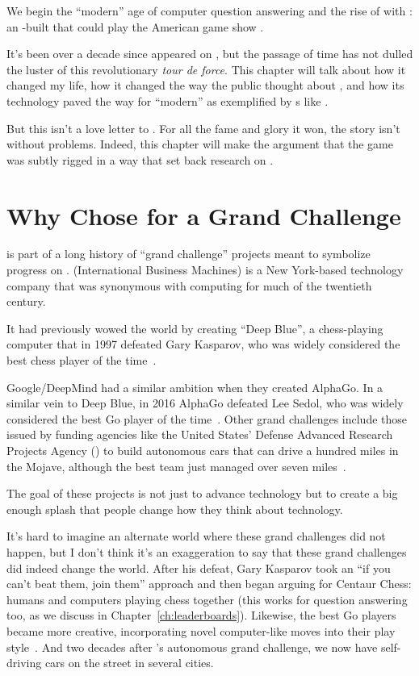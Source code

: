 
We begin the ``modern'' age of computer question answering and the rise of
 with \watson{}: an -built  that could play the
American game show \jeopardyf{}.

It's been over a decade since \watson{} appeared on , but the
passage of time has not dulled the luster of this revolutionary
\textit{tour de force}.
%
This chapter will talk about how it changed my life, how it
changed the way the public thought about , and how its technology
paved the way for ``modern''  as exemplified by \mm{}s like .

But this isn't a love letter to \watson{}.
%
For all the fame and glory it won, the \watson{} story isn't without
problems.
%
Indeed, this chapter will make the
argument that the game was subtly rigged in a way that set back research on
.

\section{Why  Chose \jeopardy{} for a Grand Challenge}
\label{sec:grand-challenge}

\watson{} is part of a long history of ``grand challenge'' projects meant to
symbolize progress on .
%
 (International Business Machines) is a New York-based technology
company that was synonymous with computing for much of the twentieth century.



It had previously wowed the world by creating ``Deep Blue'', a chess-playing
computer that in 1997 defeated Gary Kasparov, who was widely considered the
best chess player of the time~\citep{hsu-02}.

Google/DeepMind had a similar ambition when they created AlphaGo.
%
In a similar vein to Deep Blue, in 2016 AlphaGo defeated Lee Sedol,
who was widely considered the best Go player of the time~\citep{koch-16}.
%
Other  grand challenges include those issued by funding agencies like
the United States' Defense Advanced Research Projects Agency
() to build autonomous cars that can drive a hundred miles
in the Mojave, although the best team just managed over seven miles~\citep{patterson-05}.
%

The goal of these projects is not just to advance technology but to create a
big enough splash that people change how they think about technology.

It's hard to imagine an alternate world where these grand challenges did not
happen, but I don't think it's an exaggeration to say that these grand challenges
did indeed change the world.  
%
After his defeat, Gary Kasparov took an ``if you can't beat them, join them''
approach and then began arguing for Centaur Chess: humans and computers
playing chess together (this works for question answering too, as we discuss
in Chapter~\ref{ch:leaderboards}).
%
Likewise, the best Go players became more creative, incorporating
novel computer-like moves into their play style~\citep{shin-25}.
%
And two decades after 's autonomous grand challenge, we now have
self-driving cars on the street in several  cities.

